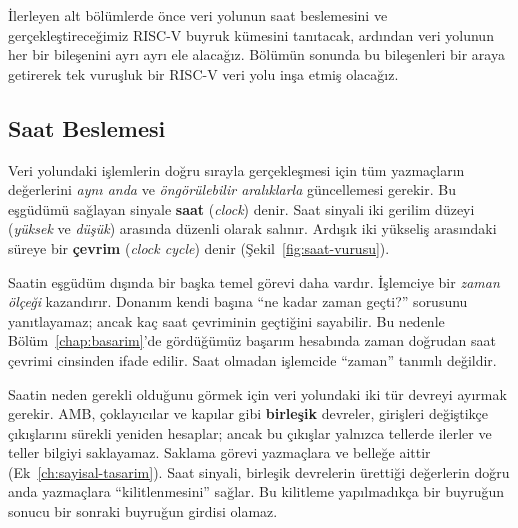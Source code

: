 İlerleyen alt bölümlerde önce veri yolunun saat beslemesini ve gerçekleştireceğimiz RISC-V buyruk kümesini tanıtacak, ardından veri yolunun her bir bileşenini ayrı ayrı ele alacağız. Bölümün sonunda bu bileşenleri bir araya getirerek tek vuruşluk bir RISC-V veri yolu inşa etmiş olacağız.

\subsection{Saat Beslemesi}
\label{subsec:saat-beslemesi}

Veri yolundaki işlemlerin doğru sırayla gerçekleşmesi için tüm yazmaçların değerlerini \emph{aynı anda} ve \emph{öngörülebilir aralıklarla} güncellemesi gerekir. Bu eşgüdümü sağlayan sinyale \textbf{saat} (\emph{clock}) denir. Saat sinyali iki gerilim düzeyi (\emph{yüksek} ve \emph{düşük}) arasında düzenli olarak salınır. Ardışık iki yükseliş arasındaki süreye bir \textbf{çevrim} (\emph{clock cycle}) denir (Şekil~\ref{fig:saat-vurusu}).

Saatin eşgüdüm dışında bir başka temel görevi daha vardır. İşlemciye bir \emph{zaman ölçeği} kazandırır. Donanım kendi başına ``ne kadar zaman geçti?'' sorusunu yanıtlayamaz; ancak kaç saat çevriminin geçtiğini sayabilir. Bu nedenle Bölüm~\ref{chap:basarim}'de gördüğümüz başarım hesabında zaman doğrudan saat çevrimi cinsinden ifade edilir. Saat olmadan işlemcide ``zaman'' tanımlı değildir.

Saatin neden gerekli olduğunu görmek için veri yolundaki iki tür devreyi ayırmak gerekir. AMB, çoklayıcılar ve kapılar gibi \textbf{birleşik} devreler, girişleri değiştikçe çıkışlarını sürekli yeniden hesaplar; ancak bu çıkışlar yalnızca tellerde ilerler ve teller bilgiyi saklayamaz. Saklama görevi yazmaçlara ve belleğe aittir (Ek~\ref{ch:sayisal-tasarim}). Saat sinyali, birleşik devrelerin ürettiği değerlerin doğru anda yazmaçlara ``kilitlenmesini'' sağlar. Bu kilitleme yapılmadıkça bir buyruğun sonucu bir sonraki buyruğun girdisi olamaz.

